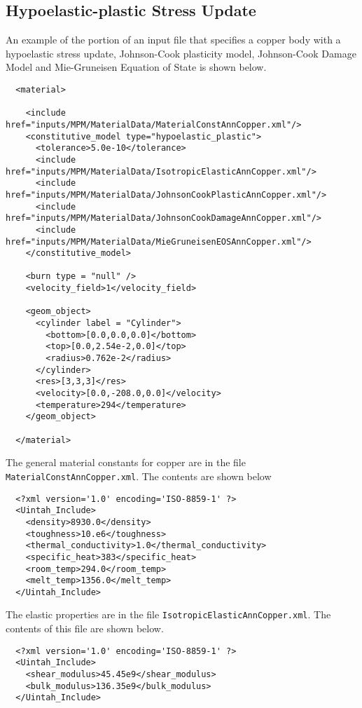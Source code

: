   \subsection{Hypoelastic-plastic Stress Update}
  An example of the portion of an input file that specifies a copper body
  with a hypoelastic stress update, Johnson-Cook plasticity model,
  Johnson-Cook Damage Model and Mie-Gruneisen Equation of State is shown 
  below.
  \begin{verbatim}
  <material>

    <include href="inputs/MPM/MaterialData/MaterialConstAnnCopper.xml"/>
    <constitutive_model type="hypoelastic_plastic">
      <tolerance>5.0e-10</tolerance>
      <include href="inputs/MPM/MaterialData/IsotropicElasticAnnCopper.xml"/>
      <include href="inputs/MPM/MaterialData/JohnsonCookPlasticAnnCopper.xml"/>
      <include href="inputs/MPM/MaterialData/JohnsonCookDamageAnnCopper.xml"/>
      <include href="inputs/MPM/MaterialData/MieGruneisenEOSAnnCopper.xml"/>
    </constitutive_model>

    <burn type = "null" />
    <velocity_field>1</velocity_field>

    <geom_object>
      <cylinder label = "Cylinder">
        <bottom>[0.0,0.0,0.0]</bottom>
        <top>[0.0,2.54e-2,0.0]</top>
        <radius>0.762e-2</radius>
      </cylinder>
      <res>[3,3,3]</res>
      <velocity>[0.0,-208.0,0.0]</velocity>
      <temperature>294</temperature>
    </geom_object>

  </material>
  \end{verbatim}

  The general material constants for copper are in the file 
  \verb+MaterialConstAnnCopper.xml+.  The contents are shown below
  \begin{verbatim}
  <?xml version='1.0' encoding='ISO-8859-1' ?>
  <Uintah_Include>
    <density>8930.0</density>
    <toughness>10.e6</toughness>
    <thermal_conductivity>1.0</thermal_conductivity>
    <specific_heat>383</specific_heat>
    <room_temp>294.0</room_temp>
    <melt_temp>1356.0</melt_temp>
  </Uintah_Include>
  \end{verbatim}

  The elastic properties are in the file \verb+IsotropicElasticAnnCopper.xml+.
  The contents of this file are shown below.
  \begin{verbatim}
  <?xml version='1.0' encoding='ISO-8859-1' ?>
  <Uintah_Include>
    <shear_modulus>45.45e9</shear_modulus>
    <bulk_modulus>136.35e9</bulk_modulus>
  </Uintah_Include>
  \end{verbatim}
  
